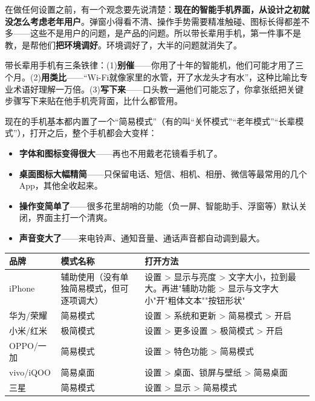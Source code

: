 


在做任何设置之前，有一个观念要先说清楚：\textbf{现在的智能手机界面，从设计之初就没怎么考虑老年用户}。弹窗小得看不清、操作手势需要精准触碰、图标长得都差不多——这些不是用户的问题，是产品的问题。所以带长辈用手机，第一件事不是教，是帮他们\textbf{把环境调好}。环境调好了，大半的问题就消失了。

带长辈用手机有三条铁律：(1)\textbf{别催}——你用了十年的智能机，他们可能才用了三个月。(2)\textbf{用类比}——“Wi-Fi就像家里的水管，开了水龙头才有水”，这种比喻比专业术语好理解一万倍。(3)\textbf{写下来}——口头教一遍他们可能忘了，你拿张纸把关键步骤写下来贴在他手机壳背面，比什么都管用。


现在的手机基本都内置了一个“简易模式”（有的叫“关怀模式”“老年模式”“长辈模式”），打开之后，整个手机都会大变样：

\begin{itemize}
  \item \textbf{字体和图标变得很大}——再也不用戴老花镜看手机了。
  \item \textbf{桌面图标大幅精简}——只保留电话、短信、相机、相册、微信等最常用的几个App，其他全收起来。
  \item \textbf{操作变简单了}——很多花里胡哨的功能（负一屏、智能助手、浮窗等）默认关闭，界面主打一个清爽。
  \item \textbf{声音变大了}——来电铃声、通知音量、通话声音都自动调到最大。
\end{itemize}


\begin{center}
\begin{tabularx}{\linewidth}{|X|X|X|}
\hline
\textbf{品牌} & \textbf{模式名称} & \textbf{打开方法} \tabularnewline
\hline
iPhone & 辅助使用（没有单独简易模式，但可逐项调大） & 设置 > 显示与亮度 > 文字大小，拉到最大。再进"辅助功能 > 显示与文字大小"开"粗体文本""按钮形状" \tabularnewline
华为/荣耀 & 简易模式 & 设置 > 系统和更新 > 简易模式 > 开启 \tabularnewline
小米/红米 & 极简模式 & 设置 > 更多设置 > 极简模式 > 开启 \tabularnewline
OPPO/一加 & 简易模式 & 设置 > 特色功能 > 简易模式 \tabularnewline
vivo/iQOO & 简易桌面 & 设置 > 桌面、锁屏与壁纸 > 简易桌面 \tabularnewline
三星 & 简易模式 & 设置 > 显示 > 简易模式 \tabularnewline
\hline
\end{tabularx}
\end{center}

